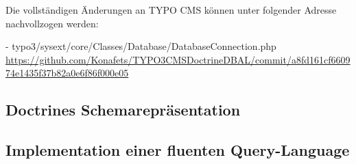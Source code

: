 Die vollständigen Änderungen an TYPO CMS können unter folgender Adresse nachvollzogen werden:

- typo3/sysext/core/Classes/Database/DatabaseConnection.php \url{https://github.com/Konafets/TYPO3CMSDoctrineDBAL/commit/a8fd161cf660974e1435f37b82a0e6f86f000e05}

\subsection{Doctrines Schemarepräsentation}

\subsection{Implementation einer fluenten Query-Language}

